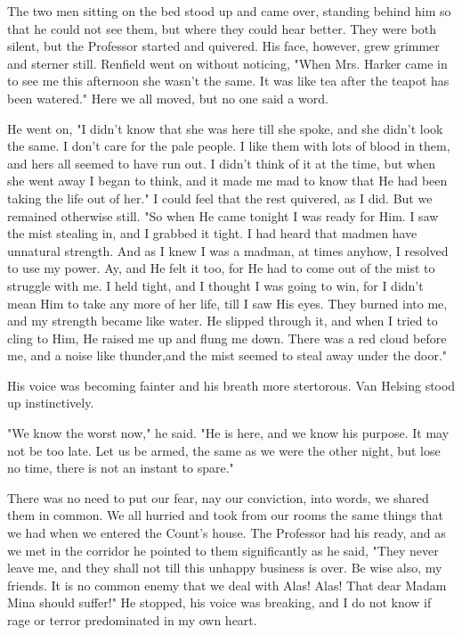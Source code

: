 The two men sitting on the bed stood up and came over, standing behind him so that he could not see them, but where they could hear better. They were both silent, but the Professor started and quivered. His face, however, grew grimmer and sterner still. Renfield went on without noticing, "When Mrs. Harker came in to see me this afternoon she wasn't the same. It was like tea after the teapot has been watered." Here we all moved, but no one said a word. 

He went on, "I didn't know that she was here till she spoke, and she didn't look the same. I don't care for the pale people. I like them with lots of blood in them, and hers all seemed to have run out. I didn't think of it at the time, but when she went away I began to think, and it made me mad to know that He had been taking the life out of her." I could feel that the rest quivered, as I did. But we remained otherwise still. "So when He came tonight I was ready for Him. I saw the mist stealing in, and I grabbed it tight. I had heard that madmen have unnatural strength. And as I knew I was a madman, at times anyhow, I resolved to use my power. Ay, and He felt it too, for He had to come out of the mist to struggle with me. I held tight, and I thought I was going to win, for I didn't mean Him to take any more of her life, till I saw His eyes. They burned into me, and my strength became like water. He slipped through it, and when I tried to cling to Him, He raised me up and flung me down. There was a red cloud before me, and a noise like thunder,and the mist seemed to steal away under the door." 

His voice was becoming fainter and his breath more stertorous. Van Helsing stood up instinctively. 

"We know the worst now," he said. "He is here, and we know his purpose. It may not be too late. Let us be armed, the same as we were the other night, but lose no time, there is not an instant to spare." 

There was no need to put our fear, nay our conviction, into words, we shared them in common. We all hurried and took from our rooms the same things that we had when we entered the Count's house. The Professor had his ready, and as we met in the corridor he pointed to them significantly as he said, "They never leave me, and they shall not till this unhappy business is over. Be wise also, my friends. It is no common enemy that we deal with Alas! Alas! That dear Madam Mina should suffer!" He stopped, his voice was breaking, and I do not know if rage or terror predominated in my own heart. 

